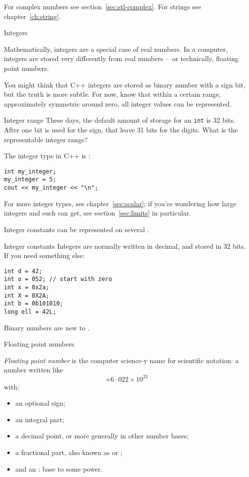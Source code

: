 For complex numbers see section~\ref{sec:stl-complex}.
For strings see chapter~\ref{ch:string}.

 {Integers}

Mathematically, integers are a special case of real numbers.
In a computer, integers are stored very differently from
real numbers --~or technically, floating point numbers.

You might think that C++ integers are stored as binary number with a sign  bit,
but the truth is more subtle.
For now, know that 
within a certain range, approximately symmetric around zero,
all integer values can be represented.

\begin{exercise}{Integer range}
  \label{ex:int-range}
  These days, the default amount of storage for an \lstinline{int} is
  32 bits. After one bit is used for the sign, that leave 31 bits for
  the digits. What is the representable integer range?
\end{exercise}

The integer type in C++ is :
\begin{lstlisting}
int my_integer;
my_integer = 5;
cout << my_integer << "\n";
\end{lstlisting}

For more integer types, see chapter~\ref{sec:scalar};
if you're wondering how large integers and such can get,
see section~\ref{sec:limits} in particular.

Integer constants can be represented on several .

\begin{block}{Integer constants}
  \label{sl:intvals}
  Integers are normally  written in decimal, and stored in 32 bits.
  If you need something else:
\begin{lstlisting}
int d = 42;
int o = 052; // start with zero
int x = 0x2a;
int X = 0X2A;
int b = 0b101010;
long ell = 42L;
\end{lstlisting}
\end{block}

Binary numbers are new to .

 {Floating point numbers}

\emph{Floating point number}
is the computer science-y name for scientific notation:
a number written like
\[ +6\cdot 022 \times 10^{23} \]
with:
\begin{itemize}
\item an optional sign;
\item an integral part;
\item a decimal point, or more generally 
  in other number bases;
\item a fractional part, also known as 
  or ;
\item and an : base to some power.
\end{itemize}

